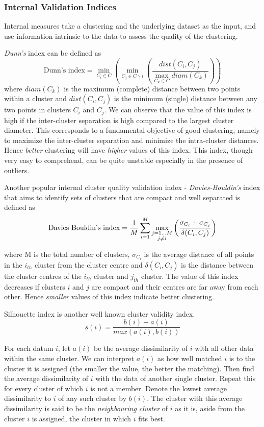 \subsubsection{Internal Validation Indices} \label{chap2:subsec:cluster_validity_internal}
Internal measures take a clustering and the underlying dataset as the input, and use information intrinsic to the data to assess the quality of the clustering. 

\textit{Dunn's} index can be defined as 
\[
\text{Dunn's index}= \min_{C_{i}\in C} \left( \min_{C_{j} \in C \backslash i} \left( \frac{dist(C_{i},C_{j})}{\max_{C_{k}\in C}diam(C_{k})} \right) \right)
\]
where $diam(C_{k})$ is the maximum (complete) distance between two points within a cluster and $dist(C_{i},C_{j})$ is the minimum (single) distance between any two points in clusters $C_{i}$ and $C_{j}$. We can observe that the value of this index is high if the inter-cluster separation is high compared to the largest cluster diameter. This corresponds to a fundamental objective of good clustering, namely to maximize the inter-cluster separation and minimize the intra-cluster distances. Hence \textit{better} clustering will have \textit{higher} values of this index. This index, though very easy to comprehend, can be quite unstable especially in the presence of outliers. 

Another popular internal cluster quality validation index - \textit{Davies-Bouldin's} index that aims to identify sets of clusters that are compact and well separated is defined as
\[
\text{Davies Bouldin's index}=\frac{1}{M} \sum_{i=1}^{M}\max_{\begin{subarray}{c}j=1\dots M \\ j\neq i \end{subarray}} \left( \frac{\sigma_{C_{i}}+\sigma_{C_{j}}}{\delta(C_{i},C_{j})} \right)
\]

where M is the total number of clusters, $\sigma_{C_{i}}$ is the average distance of all points in the $i_{th}$ cluster from the cluster centre and $\delta(C_{i},C_{j})$ is the distance between the cluster centres of the $i_{th}$ cluster and $j_{th}$ cluster. The value of this index decreases if clusters $i$ and $j$ are compact and their centres are far away from each other. Hence \textit{smaller} values of this index indicate better clustering.

Silhouette index is another well known cluster validity index.
\[
s(i)=\frac{b(i)-a(i)}{max(a(i),b(i))} 
\]

For each datum $i$, let $a(i)$ be the average dissimilarity of $i$ with all other data within the same cluster. We can interpret $a(i)$ as how well matched $i$ is to the cluster it 
is assigned (the smaller the value, the better the matching). Then find the average dissimilarity of $i$ with the data of another single cluster. Repeat this for every cluster of 
which $i$ is not a member. Denote the lowest average dissimilarity to $i$ of any such cluster by $b(i)$. The cluster with this average dissimilarity is said to be the 
\textit{neighbouring cluster} of $i$ as it is, aside from the cluster $i$ is assigned, the cluster in which $i$ fits best.

